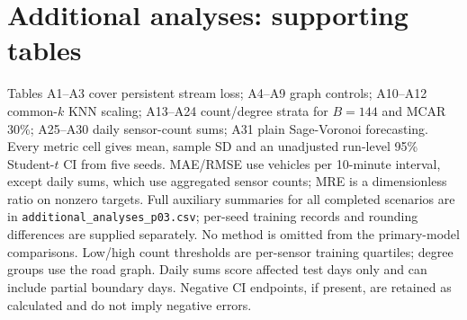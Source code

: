 
\clearpage

\begingroup

\hypersetup{linkcolor=black}

\renewcommand{\thetable}{A\arabic{table}}

\setcounter{table}{0}

\section*{{Additional analyses: supporting tables}}

{Tables A1--A3 cover persistent stream loss; A4--A9 graph controls; A10--A12 common-$k$ KNN scaling; A13--A24 count/degree strata for $B=144$ and MCAR 30\%; A25--A30 daily sensor-count sums; A31 plain Sage-Voronoi forecasting. Every metric cell gives mean, sample SD and an unadjusted run-level 95\% Student-$t$ CI from five seeds. MAE/RMSE use vehicles per 10-minute interval, except daily sums, which use aggregated sensor counts; MRE is a dimensionless ratio on nonzero targets. Full auxiliary summaries for all completed scenarios are in \texttt{additional\_analyses\_p03.csv}; per-seed training records and rounding differences are supplied separately. No method is omitted from the primary-model comparisons. Low/high count thresholds are per-sensor training quartiles; degree groups use the road graph. Daily sums score affected test days only and can include partial boundary days. Negative CI endpoints, if present, are retained as calculated and do not imply negative errors.}

